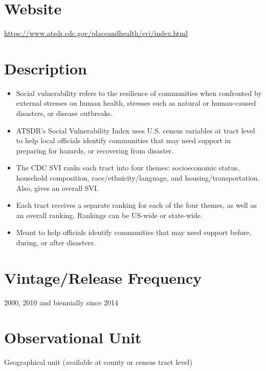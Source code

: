 \documentclass[
]{book}
\providecommand{\tightlist}{%
  \setlength{\itemsep}{0pt}\setlength{\parskip}{0pt}}
\begin{document}
\hypertarget{website-82}{%
\section{Website}\label{website-82}}

\url{https://www.atsdr.cdc.gov/placeandhealth/svi/index.html}

\hypertarget{description-82}{%
\section{Description}\label{description-82}}

\begin{itemize}
\tightlist
\item
  Social vulnerability refers to the resilience of communities when confronted by external stresses on human health, stresses such as natural or human-caused disasters, or disease outbreaks.
\item
  ATSDR's Social Vulnerability Index uses U.S. census variables at tract level to help local officials identify communities that may need support in preparing for hazards, or recovering from disaster.
\item
  The CDC SVI ranks each tract into four themes: socioeconomic status, household composition, race/ethnicity/language, and housing/transportation. Also, gives an overall SVI.
\item
  Each tract receives a separate ranking for each of the four themes, as well as an overall ranking. Rankings can be US-wide or state-wide.
\item
  Meant to help officials identify communities that may need support before, during, or after disasters.
\end{itemize}

\hypertarget{vintagerelease-frequency-82}{%
\section{Vintage/Release Frequency}\label{vintagerelease-frequency-82}}

2000, 2010 and biennially since 2014

\hypertarget{observational-unit-82}{%
\section{Observational Unit}\label{observational-unit-82}}

Geographical unit (available at county or census tract level)
\end{document}

